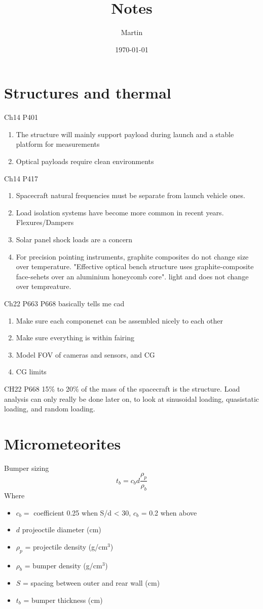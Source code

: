 \documentclass[11pt,a4paper]{article}
\title{Notes}
\author{Martin}
\date{\today}
\begin{document}
\maketitle

\section{Structures and thermal}
Ch14 P401
\begin{enumerate}
    \item The structure will mainly support payload during launch and a stable platform for measurements
    \item Optical payloads require clean environments
\end{enumerate}
Ch14 P417
\begin{enumerate}
    \item Spacecraft natural frequencies must be separate from launch vehicle ones.
    \item Load isolation systems have become more common in recent years. Flexures/Dampers
    \item Solar panel shock loads are a concern
    \item For precision pointing instruments, graphite composites do not change size over temperature. "Effective optical bench structure uses graphite-composite face-sehets over an aluminium honeycomb core". light and does not change over tempreature.
\end{enumerate}
Ch22 P663
P668 basically tells me cad
\begin{enumerate}
    \item Make sure each componenet can be assembled nicely to each other
    \item Make sure everything is within fairing
    \item Model FOV of cameras and sensors, and CG
    \item CG limits
\end{enumerate}
CH22 P668
15\% to 20\% of the mass of the spacecraft is the structure. 
Load analysis can only really be done later on, to look at sinusoidal loading, quasistatic loading, and random loading.

\section{Micrometeorites}
Bumper sizing
\begin{equation}
    t_b = c_b d \frac{\rho_p}{\rho_b}
\end{equation}
Where
\begin{itemize}
    \item $c_b = $ coefficient 0.25 when S/d < 30, $c_b$ = 0.2 when above
    \item $d$ projeoctile diameter (cm)
    \item $\rho_p$ = projectile density (g/cm$^3$)
    \item $\rho_b$ = bumper density (g/cm$^3$)
    \item $S$ = spacing between outer and rear wall (cm)
    \item $t_b$ = bumper thickness (cm)
\end{itemize}
\end{document}
